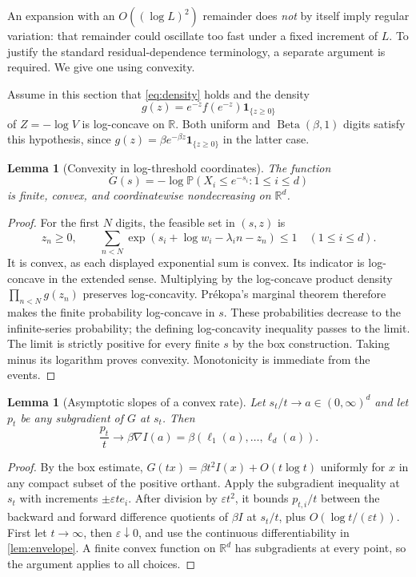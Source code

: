\documentclass[11pt,a4paper]{article}
\newtheorem{lemma}[theorem]{Lemma}
\theoremstyle{definition}
\theoremstyle{remark}
\newcommand{\PP}{\mathbb P}
\newcommand{\RR}{\mathbb R}
\newcommand{\ind}{\mathbf 1}
\numberwithin{equation}{section}
\begin{document}
An expansion with an $O((\log L)^2)$ remainder does \emph{not} by itself
imply regular variation: that remainder could oscillate too fast under a
fixed increment of $L$. To justify the standard residual-dependence
terminology, a separate argument is required. We give one using convexity.

Assume in this section that \eqref{eq:density} holds and the density
\begin{equation}
 g(z)=e^{-z}f(e^{-z})\ind_{\{z\ge0\}}
 \label{eq:logdigit}
\end{equation}
of $Z=-\log V$ is log-concave on $\RR$. Both uniform and
$\operatorname{Beta}(\beta,1)$ digits satisfy this hypothesis, since
$g(z)=\beta e^{-\beta z}\ind_{\{z\ge0\}}$ in the latter case.

\begin{lemma}[Convexity in log-threshold coordinates]
\label{lem:convexG}
The function
\begin{equation}
 G(s)=-\log\PP(X_i\le e^{-s_i}:1\le i\le d)
 \label{eq:G}
\end{equation}
is finite, convex, and coordinatewise nondecreasing on $\RR^d$.
\end{lemma}
\begin{proof}
For the first $N$ digits, the feasible set in $(s,z)$ is
\[
 z_n\ge0,\qquad
 \sum_{n<N}\exp(s_i+\log w_i-\lambda_i n-z_n)\le1
 \quad(1\le i\le d).
\]
It is convex, as each displayed exponential sum is convex. Its indicator
is log-concave in the extended sense. Multiplying by the log-concave
product density $\prod_{n<N}g(z_n)$ preserves log-concavity.
Pr\'ekopa's marginal theorem \cite{Prekopa} therefore makes the finite
probability log-concave in $s$. These probabilities decrease to the
infinite-series probability; the defining log-concavity inequality passes
to the limit. The limit is strictly positive for every finite $s$ by the
box construction. Taking minus its logarithm proves convexity. Monotonicity
is immediate from the events.
\end{proof}

\begin{lemma}[Asymptotic slopes of a convex rate]
\label{lem:grad}
Let $s_t/t\to a\in(0,\infty)^d$ and let $p_t$ be any subgradient of
$G$ at $s_t$. Then
\begin{equation}
 \frac{p_t}{t}\longrightarrow\beta\nabla I(a)
 =\beta(\ell_1(a),\ldots,\ell_d(a)).
 \label{eq:gradient-limit}
\end{equation}
\end{lemma}
\begin{proof}
By the box estimate, $G(tx)=\beta t^2I(x)+O(t\log t)$ uniformly for
$x$ in any compact subset of the positive orthant. Apply the subgradient
inequality at $s_t$ with increments $\pm\varepsilon t e_i$.
After division by $\varepsilon t^2$, it bounds $p_{t,i}/t$ between the
backward and forward difference quotients of $\beta I$ at $s_t/t$,
plus $O(\log t/(\varepsilon t))$. First let $t\to\infty$, then
$\varepsilon\downarrow0$, and use the continuous differentiability in
\cref{lem:envelope}. A finite convex function on $\RR^d$ has subgradients
at every point, so the argument applies to all choices.
\end{proof}
\end{document}
